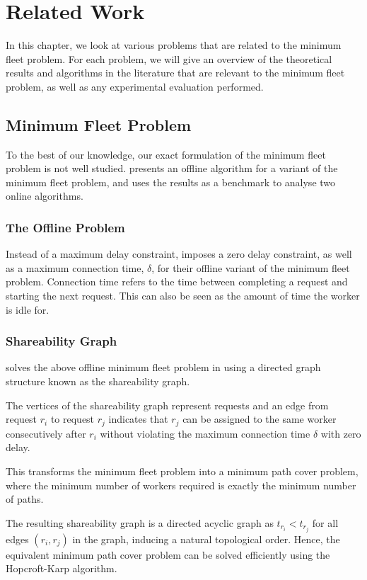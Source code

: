 \documentclass[urop]{socreport}
\begin{document}
\chapter{Related Work}
\label{ch:related}
In this chapter, we look at various problems that are related to the minimum fleet problem. For each problem, we will give an overview of the theoretical results and algorithms in the literature that are relevant to the minimum fleet problem, as well as any experimental evaluation performed. 

\section{Minimum Fleet Problem}
To the best of our knowledge, our exact formulation of the minimum fleet problem is not well studied. \cite{nature} presents an offline algorithm for a variant of the minimum fleet problem, and uses the results as a benchmark to analyse two online algorithms.

\subsection{The Offline Problem}
Instead of a maximum delay constraint, \cite{nature} imposes a zero delay constraint, as well as a maximum connection time, $\delta$, for their offline variant of the minimum fleet problem. Connection time refers to the time between completing a request and starting the next request. This can also be seen as the amount of time the worker is idle for. 

\subsection{Shareability Graph}
\cite{nature} solves the above offline minimum fleet problem in using a directed graph structure known as the shareability graph.

The vertices of the shareability graph represent requests and an edge from request $r_i$ to request $r_j$ indicates that $r_j$ can be assigned to the same worker consecutively after $r_i$ without violating the maximum connection time $\delta$ with zero delay.

This transforms the minimum fleet problem into a minimum path cover problem, where the minimum number of workers required is exactly the minimum number of paths.

The resulting shareability graph is a directed acyclic graph as $t_{r_i} < t_{r_j}$ for all edges $(r_i, r_j)$ in the graph, inducing a natural topological order. Hence, the equivalent minimum path cover problem can be solved efficiently using the Hopcroft-Karp algorithm.
\end{document}
